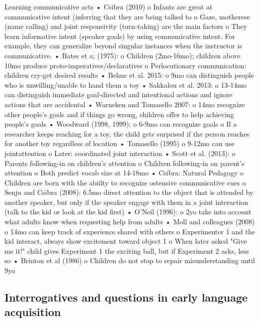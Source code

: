 Learning communicative acts
•	Csibra (2010)
o	Infants are great at communicative intent (inferring that they are being talked to
o	Gaze, motherese (name calling) and joint responsivity (turn-taking) are the main factors 
o	They learn informative intent (speaker goals) by using communicative intent. For example, they can generalize beyond singular instances when the instructor is communicative. 
•	Bates et a; (1975): 
o	Children (2mo-16mo); children above 10mo produce proto-imperatives/declaratives
o	Perlocutionary communication: children cry-get desired results
•	Behne et al. 2015: 
o	9mo can distinguish people who is unwilling/unable to hand them a toy 
•	Sakkalou et al. 2013: 
o	13-14mo can distinguish immediate goal-directed and intentional actions and ignore actions that are accidental
•	Warneken and Tomasello 2007:
o	14mo recognize other people's goals and if things go wrong, children offer to help achieving people's goals
•	Woodward (1998, 1999): 
o	6-9mo can recognize goals
o	If a researcher keeps reaching for a toy, the child gets surprised if the person reaches for another toy regardless of location
•	Tomasello (1995)
o	9-12mo can use jointattention 
o	Later: coordinated joint interaction
•	Scott et al. (2013):
o	Parents following-in on children's attention
o	Children following-in on parent's attention
o	Both predict vocab size at 14-18mo
•	Csibra: Natural Pedagogy 
o	Children are born with the abiilty to recognize ostensive communicative cues
o	Senju and Csibra (2008): 6.5mo direct attention to the object that is attended by another speaker, but only if the speaker engage with them in a joint interaction (talk to the kid or look at the kid first)
•	O'Neil (1996):
o	2yo take into account what adults know when requesting help from adults
•	Moll and colleagues (2008)
o	14mo can keep track of experience shared with others
o	Experimenter 1 and the kid interact, always show excitement toward object 1
o	When later asked "Give me it!" child gives Experiment 1 the exciting ball, but if Experiment 2 asks, less so
•	Brinton et al (1986)
o	Children do not stop to repair misunderstanding until 9yo


\subsection{Interrogatives and questions in early language acquisition}\label{bg:acq}
	
